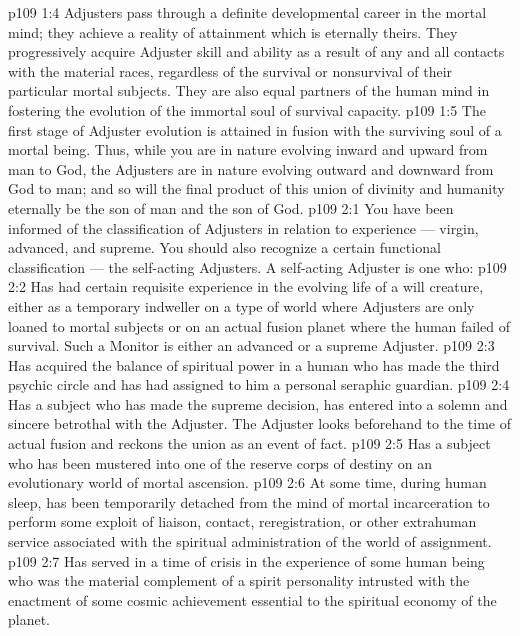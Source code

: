 \vs p109 1:4 Adjusters pass through a definite developmental career in the mortal mind; they achieve a reality of attainment which is eternally theirs. They progressively acquire Adjuster skill and ability as a result of any and all contacts with the material races, regardless of the survival or nonsurvival of their particular mortal subjects. They are also equal partners of the human mind in fostering the evolution of the immortal soul of survival capacity.
\vs p109 1:5 The first stage of Adjuster evolution is attained in fusion with the surviving soul of a mortal being. Thus, while you are in nature evolving inward and upward from man to God, the Adjusters are in nature evolving outward and downward from God to man; and so will the final product of this union of divinity and humanity eternally be the son of man and the son of God.
\vs p109 2:1 You have been informed of the classification of Adjusters in relation to experience --- virgin, advanced, and supreme. You should also recognize a certain functional classification --- the self\hyp{}acting Adjusters. A self\hyp{}acting Adjuster is one who:
\vs p109 2:2 \pc {}\bibnobreakspace Has had certain requisite experience in the evolving life of a will creature, either as a temporary indweller on a type of world where Adjusters are only loaned to mortal subjects or on an actual fusion planet where the human failed of survival. Such a Monitor is either an advanced or a supreme Adjuster.
\vs p109 2:3 \bibnobreakspace Has acquired the balance of spiritual power in a human who has made the third psychic circle and has had assigned to him a personal seraphic guardian.
\vs p109 2:4 \pc {}\bibnobreakspace Has a subject who has made the supreme decision, has entered into a solemn and sincere betrothal with the Adjuster. The Adjuster looks beforehand to the time of actual fusion and reckons the union as an event of fact.
\vs p109 2:5 \pc {}\bibnobreakspace Has a subject who has been mustered into one of the reserve corps of destiny on an evolutionary world of mortal ascension.
\vs p109 2:6 \pc {}\bibnobreakspace At some time, during human sleep, has been temporarily detached from the mind of mortal incarceration to perform some exploit of liaison, contact, reregistration, or other extrahuman service associated with the spiritual administration of the world of assignment.
\vs p109 2:7 \pc {}\bibnobreakspace Has served in a time of crisis in the experience of some human being who was the material complement of a spirit personality intrusted with the enactment of some cosmic achievement essential to the spiritual economy of the planet.
